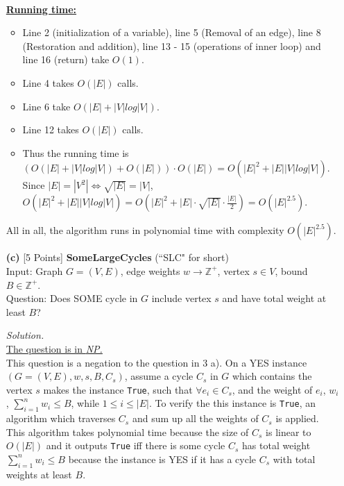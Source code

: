 \documentclass[10pt]{article}
\begin{document}
\begin{itemize}
\begin{mdframed}
    \\
    \underline{\textbf{Running time:}}
    \begin{itemize}
        \item Line 2 (initialization of a variable), line 5 (Removal of an edge), line 8 (Restoration and addition), line 13 - 15 (operations of inner loop) and line 16 (return) take $O(1)$.
        \item Line 4 takes $O(|E|)$ calls.
        \item Line 6 take $O(|E| + |V|log|V|)$.
        \item Line 12 takes $O(|E|)$ calls.
        \item Thus the running time is $(O(|E| + |V|log|V|) + O(|E|)) \cdot O(|E|) = O(|E|^2 + |E||V|log|V|)$. Since $|E| = |V^2| \iff \sqrt{|E|} = |V|$, $O(|E|^2 + |E||V|log|V|) = O(|E|^2 + |E| \cdot \sqrt{|E|} \cdot \frac{|E|}{2}) = O(|E|^{2.5})$.
    \end{itemize}
    All in all, the algorithm runs in polynomial time with complexity $O(|E|^{2.5})$.
    \end{mdframed}
    \item [\textbf{(c)}] {[5 Points]} \textbf{SomeLargeCycles} (``SLC" for short)\\
    Input: Graph $G = (V, E)$, edge weights $w \rightarrow \mathbb{Z}^+$, vertex $s \in V$, bound $B \in \mathbb{Z}^+$.\\
    Question: Does SOME cycle in $G$ include vertex $s$ and have total weight at least $B$?
    \begin{mdframed}
        \textit{Solution.}\\
        \underline{The question is in \textit{NP.}}\\
        This question is a negation to the question in 3 a). On a YES instance $(G = (V, E), w, s, B, C_s)$, assume a cycle $C_s$ in $G$ which contains the vertex $s$ makes the instance \texttt{True}, such that $\forall e_i \in C_s$, and the weight of $e_i$, $w_i$, $\sum_{i = 1}^{n} w_i \leq B$, while $1 \leq i \leq |E|$. To verify the this instance is \texttt{True}, an algorithm which traverses $C_s$ and sum up all the weights of $C_s$ is applied.\\
        This algorithm takes polynomial time because the size of $C_s$ is linear to $O(|E|)$ and it outputs \texttt{True} iff there is some cycle $C_s$ has total weight $\sum_{i = 1}^{n} w_i \leq B$ because the instance is YES if it has a cycle $C_s$ with total weights at least $B$.\\

\end{mdframed}
\end{itemize}
\end{document}
